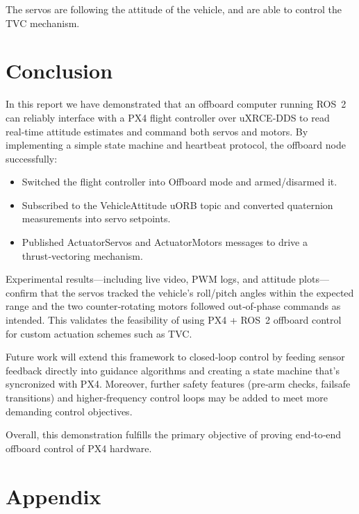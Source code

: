 \documentclass[a4paper]{article}
\begin{document}
The servos are following the attitude of the vehicle, and are able to control the TVC mechanism.

\clearpage
\section{Conclusion}

In this report we have demonstrated that an offboard computer running ROS 2 can reliably interface with a PX4 flight controller over uXRCE‑DDS to read real‑time attitude estimates and command both servos and motors. 
By implementing a simple state machine and heartbeat protocol, the offboard node successfully:

\begin{itemize}
    \item Switched the flight controller into Offboard mode and armed/disarmed it. 
    \item Subscribed to the VehicleAttitude uORB topic and converted quaternion measurements into servo setpoints. 
    \item Published ActuatorServos and ActuatorMotors messages to drive a thrust‑vectoring mechanism. 
\end{itemize}

Experimental results—including live video, PWM logs, and attitude plots—confirm that the servos tracked the vehicle’s roll/pitch angles within the expected range and the two counter‑rotating motors followed out‑of‑phase commands as intended. This validates the feasibility of using PX4 + ROS 2 offboard control for custom actuation schemes such as TVC.

Future work will extend this framework to closed‑loop control by feeding sensor feedback directly into guidance algorithms and creating a state machine that's syncronized with PX4. Moreover, further safety features (pre‑arm checks, failsafe transitions) and higher‑frequency control loops may be added to meet more demanding control objectives.  

Overall, this demonstration fulfills the primary objective of proving end‑to‑end offboard control of PX4 hardware. 

\clearpage
\section{Appendix}

\label{code::offboard_control.cpp}




\end{document}
